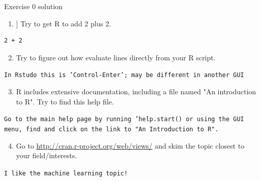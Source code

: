 \documentclass[table,smaller]{beamer}
\begin{document}
\begin{frame}[fragile,label=sec-9-1]{Exercise 0 solution}
 \begin{enumerate}
\setcounter{enumi}{0}
\item ] Try to get R to add 2 plus 2.
\end{enumerate}
\begin{verbatim}
2 + 2
\end{verbatim}

\begin{enumerate}
\setcounter{enumi}{1}
\item Try to figure out how evaluate lines directly from your R script.
\end{enumerate}
\texttt{In Rstudo this is 'Control-Enter'; may be different in another GUI}
\begin{enumerate}
\setcounter{enumi}{2}
\item R includes extensive documentation, including a file named "An introduction to R". Try to find this help file.
\end{enumerate}
\texttt{Go to the main help page by running 'help.start() or using the GUI menu, find and click on the link to "An Introduction to R".}
\begin{enumerate}
\setcounter{enumi}{3}
\item Go to \url{http://cran.r-project.org/web/views/} and skim the topic closest to your field/interests.
\end{enumerate}
\texttt{I like the machine learning topic!}
\end{frame}
\end{document}
